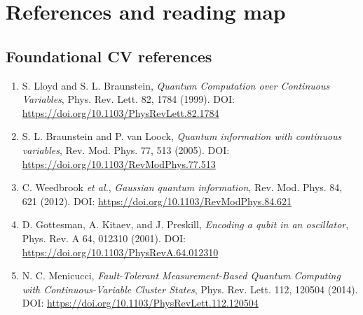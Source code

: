 \documentclass[11pt]{article}
\begin{document}
\section{References and reading map}
\subsection*{Foundational CV references}
\begin{enumerate}
\item S. Lloyd and S. L. Braunstein, \emph{Quantum Computation over Continuous Variables}, Phys. Rev. Lett. 82, 1784 (1999). DOI: \url{https://doi.org/10.1103/PhysRevLett.82.1784}
\item S. L. Braunstein and P. van Loock, \emph{Quantum information with continuous variables}, Rev. Mod. Phys. 77, 513 (2005). DOI: \url{https://doi.org/10.1103/RevModPhys.77.513}
\item C. Weedbrook \emph{et al.}, \emph{Gaussian quantum information}, Rev. Mod. Phys. 84, 621 (2012). DOI: \url{https://doi.org/10.1103/RevModPhys.84.621}
\item D. Gottesman, A. Kitaev, and J. Preskill, \emph{Encoding a qubit in an oscillator}, Phys. Rev. A 64, 012310 (2001). DOI: \url{https://doi.org/10.1103/PhysRevA.64.012310}
\item N. C. Menicucci, \emph{Fault-Tolerant Measurement-Based Quantum Computing with Continuous-Variable Cluster States}, Phys. Rev. Lett. 112, 120504 (2014). DOI: \url{https://doi.org/10.1103/PhysRevLett.112.120504}
\end{enumerate}
\end{document}

